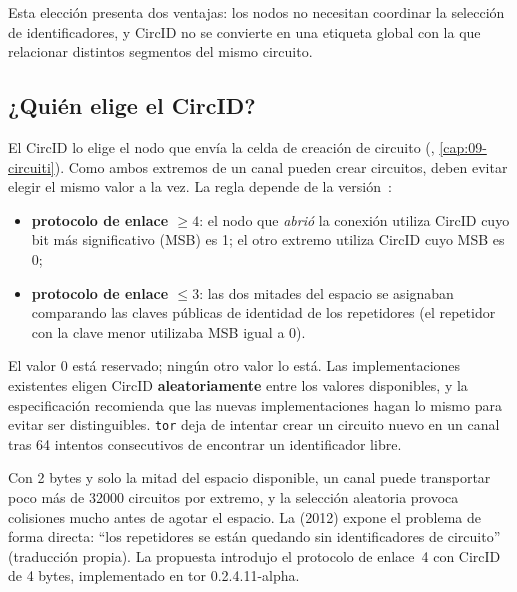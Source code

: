 Esta elección presenta dos ventajas: los nodos no necesitan coordinar la selección de identificadores, y CircID no se convierte en una etiqueta global con la que relacionar distintos segmentos del mismo circuito.

\subsection{¿Quién elige el CircID?}

El CircID lo elige el nodo que envía la celda de creación de circuito (, \cref{cap:09-circuiti}). Como ambos extremos de un canal pueden crear circuitos, deben evitar elegir el mismo valor a la vez. La regla depende de la versión~:

\begin{itemize}
  \item \textbf{protocolo de enlace $\ge 4$}: el nodo que \emph{abrió} la conexión utiliza CircID cuyo bit más significativo (MSB) es 1; el otro extremo utiliza CircID cuyo MSB es 0;
  \item \textbf{protocolo de enlace $\le 3$}: las dos mitades del espacio se asignaban comparando las claves públicas de identidad de los repetidores (el repetidor con la clave menor utilizaba MSB igual a 0).
\end{itemize}

El valor 0 está reservado; ningún otro valor lo está. Las implementaciones existentes eligen CircID \textbf{aleatoriamente} entre los valores disponibles, y la especificación recomienda que las nuevas implementaciones hagan lo mismo para evitar ser distinguibles. \texttt{tor} deja de intentar crear un circuito nuevo en un canal tras 64 intentos consecutivos de encontrar un identificador libre.

\begin{approfondimento}
Con 2 bytes y solo la mitad del espacio disponible, un canal puede transportar poco más de \num{32000} circuitos por extremo, y la selección aleatoria provoca colisiones mucho antes de agotar el espacio. La  (2012) expone el problema de forma directa: \enquote{los repetidores se están quedando sin identificadores de circuito} (traducción propia). La propuesta introdujo el protocolo de enlace~4 con CircID de 4 bytes, implementado en tor 0.2.4.11-alpha.
\end{approfondimento}

